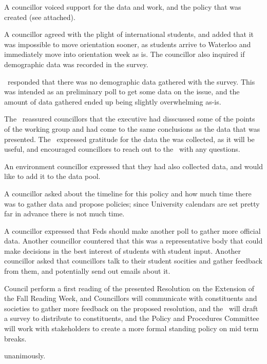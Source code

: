 \begin{information}
    A councillor voiced support for the data and work, and the policy that
    was created (see attached). 

    A councillor agreed with the plight of international students, and added 
    that it was impossible to move orientation sooner, as students arrive to
    Waterloo and immediately move into orientation week as is.  The councillor
    also inquired if demographic data was recorded in the survey. 

    \seneca\ responded that there was no demographic data gathered with the
    survey. This was intended as an preliminary poll to get some 
    data on the issue, and the amount of data gathered ended up being
    slightly overwhelming as-is. 

    The \vpof\ reassured councillors that the executive had disscussed some
    of the points of the working group and had come to the same conclusions
    as the data that was presented. The \vpof\ expressed gratitude for the
    data the was collected, as it will be useful, and encouraged
    councillors to reach out to the \vpe\ with any questions. 

    An environment councillor expressed that they had also collected data, and
    would like to add it to the data pool. 

    A councillor asked about the timeline for this policy and how much 
    time there was to gather data and propose policies; since University 
    calendars are set pretty far in advance there is not much time. 

    A councillor expressed that Feds should make another poll to gather more
    official data. Another councillor countered that this was a representative
    body that could make decisions in the best interest of students with
    student input. Another councillor asked that councillors talk to their
    student socities and gather feedback from them, and potentially send
    out emails about it. 

\end{information}

\begin{motion}

    \birt Council perform a first reading of the presented 
    Resolution on the Extension of the Fall Reading Week, and
    \bifrt Councillors will communicate with constituents and societies to
    gather more feedback on the proposed resolution, and
    \bifrt the \vpe\ will draft a survey to distribute to constituents, and
    \bifrt the Policy and Procedures Committee will work with stakeholders to 
    create a more formal standing policy on mid term breaks. 
    \movers{\seneca}{\rebecca} 

    \carries unanimously. 

\end{motion}

